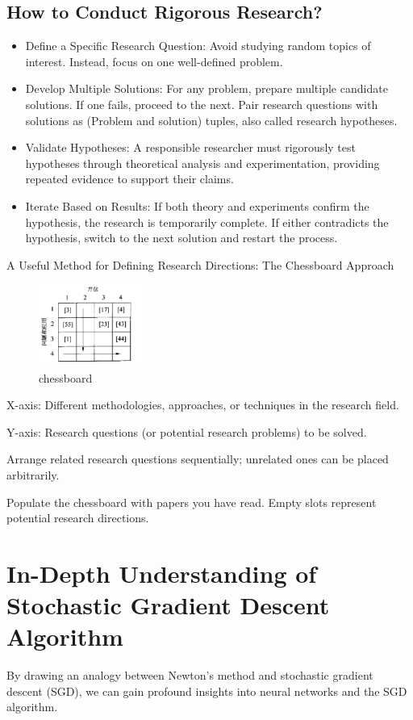 \documentclass[conference]{IEEEtran}
\begin{document}
\subsection{How to Conduct Rigorous Research?}\label{CC}
\begin{itemize}
\item Define a Specific Research Question: Avoid studying random topics of interest. Instead, focus on one well-defined problem.
\item Develop Multiple Solutions: For any problem, prepare multiple candidate solutions. If one fails, proceed to the next. Pair research questions with solutions as (Problem and solution) tuples, also called research hypotheses.
\item Validate Hypotheses: A responsible researcher must rigorously test hypotheses through theoretical analysis and experimentation, providing repeated evidence to support their claims.
\item Iterate Based on Results: If both theory and experiments confirm the hypothesis, the research is temporarily complete. If either contradicts the hypothesis, switch to the next solution and restart the process.
\end{itemize}
A Useful Method for Defining Research Directions: The Chessboard Approach
\begin{figure}[htbp]
\centering
\includegraphics[width=0.3\textwidth]{./chessboard.png}
\caption{chessboard}
\label{fig:example}
\end{figure}

X-axis: Different methodologies, approaches, or techniques in the research field.

Y-axis: Research questions (or potential research problems) to be solved.

Arrange related research questions sequentially; unrelated ones can be placed arbitrarily.

Populate the chessboard with papers you have read. Empty slots represent potential research directions.

\section{In-Depth Understanding of Stochastic Gradient Descent Algorithm}
By drawing an analogy between Newton's method and stochastic gradient descent (SGD), we can gain profound insights into neural networks and the SGD algorithm.
\end{document}
